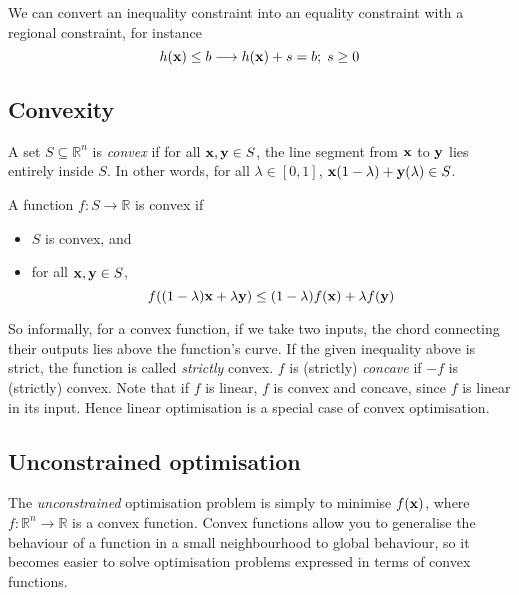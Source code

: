 We can convert an inequality constraint into an equality constraint with a regional constraint, for instance
\[
	h(\vb x) \leq b \longrightarrow h(\vb x) + s = b;\; s \geq 0
\]

\subsection{Convexity}
\begin{definition}
	A set \(S \subseteq \mathbb R^n\) is \textit{convex} if for all \(\vb x, \vb y \in S\), the line segment from \(\vb x\) to \(\vb y\) lies entirely inside \(S\).
	In other words, for all \(\lambda \in [0, 1]\), \(\vb x(1-\lambda) + \vb y(\lambda) \in S\).
\end{definition}

\begin{definition}
	A function \(f \colon S \to \mathbb R\) is convex if
	\begin{itemize}
		\item \(S\) is convex, and
		\item for all \(\vb x, \vb y \in S\),
		      \[
			      f\qty((1-\lambda)\vb x + \lambda \vb y) \leq (1-\lambda)f(\vb x) + \lambda f(\vb y)
		      \]
	\end{itemize}
\end{definition}
\noindent So informally, for a convex function, if we take two inputs, the chord connecting their outputs lies above the function's curve.
If the given inequality above is strict, the function is called \textit{strictly} convex.
\(f\) is (strictly) \textit{concave} if \(-f\) is (strictly) convex.
Note that if \(f\) is linear, \(f\) is convex and concave, since \(f\) is linear in its input.
Hence linear optimisation is a special case of convex optimisation.

\subsection{Unconstrained optimisation}
The \textit{unconstrained} optimisation problem is simply to minimise \(f(\vb x)\), where \(f \colon \mathbb R^n \to \mathbb R\) is a convex function.
Convex functions allow you to generalise the behaviour of a function in a small neighbourhood to global behaviour, so it becomes easier to solve optimisation problems expressed in terms of convex functions.

